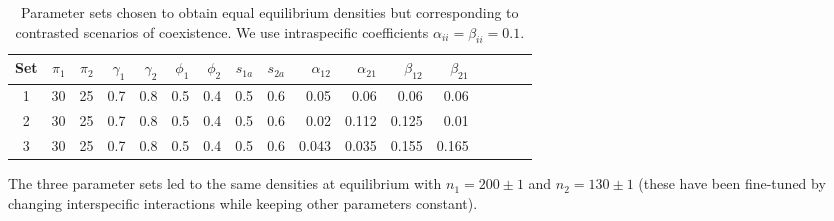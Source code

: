 \documentclass{article}
\begin{document}
\begin{table}[H]
    \centering
\begin{tabular}{|c|rr|rr|rr|rr|rrrr|rrrr|}
Set & $\pi_1$ & $\pi_2$ & $\gamma_1$ & $\gamma_2$ & $\phi_1$ & $\phi_2$ & $s_{1a}$ & $s_{2a}$ & $\alpha_{12}$ & $\alpha_{21}$ & $\beta_{12}$ & $\beta_{21}$ \\ 
  \hline
1 & 30 & 25 & 0.7 & 0.8 & 0.5 & 0.4 & 0.5 & 0.6 & 0.05 & 0.06 & 0.06 & 0.06\\ 
2 & 30 & 25 & 0.7 & 0.8 & 0.5 & 0.4 & 0.5 & 0.6 & 0.02 & 0.112 & 0.125  & 0.01\\ 
3 & 30 & 25 & 0.7 & 0.8 & 0.5 & 0.4 & 0.5 & 0.6 & 0.043 & 0.035 & 0.155  & 0.165\\ 
\end{tabular}
\caption{Parameter sets chosen to obtain equal equilibrium densities but corresponding to contrasted scenarios of coexistence. We use intraspecific coefficients $\alpha_{ii}=\beta_{ii}=0.1$.}
\label{tab:full_3parameter_sets}
\end{table}

The three parameter sets led to the same densities at equilibrium with $n_1 = 200\pm1$ and $n_2 = 130\pm1$ (these have been fine-tuned by changing interspecific interactions while keeping other parameters constant). 
\end{document}
